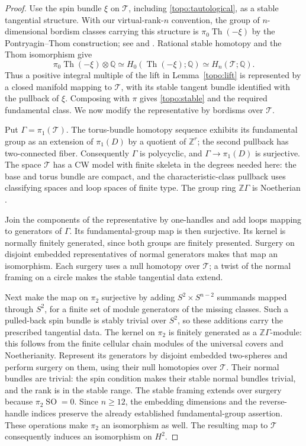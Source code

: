 \documentclass[11pt]{article}
\numberwithin{equation}{section}
\theoremstyle{definition}
\theoremstyle{remark}
\newcommand{\Q}{\mathbb Q}
\newcommand{\Z}{\mathbb Z}
\DeclareMathOperator{\SO}{SO}
\begin{document}
\begin{proof}
Use the spin bundle $\xi$ on $\mathscr T$, including
\eqref{topo:tautological}, as a stable tangential structure.
With our virtual-rank-$n$ convention, the group of $n$-dimensional
bordism classes carrying this structure is
$\pi_0\operatorname{Th}(-\xi)$ by the Pontryagin--Thom construction;
see \cite{Thom1954} and \cite[Section~2.3]{RathelFournier2024}.
Rational stable homotopy and the Thom isomorphism give
\[
 \pi_0\operatorname{Th}(-\xi)\otimes\Q
 \simeq H_0(\operatorname{Th}(-\xi);\Q)
 \simeq H_n(\mathscr T;\Q).
\]
Thus a positive integral multiple of the lift in Lemma~\ref{topo:lift}
is represented
by a closed manifold mapping to $\mathscr T$, with its stable tangent
bundle identified with the pullback of $\xi$.  Composing with $\pi$
gives \eqref{topo:stable} and the required fundamental class.  We now
modify the representative by bordisms over $\mathscr T$.

Put $\Gamma=\pi_1(\mathscr T)$.  The torus-bundle homotopy sequence
exhibits its fundamental group as an extension of $\pi_1(D)$ by a
quotient of $\Z^r$; the second pullback has two-connected fiber.
Consequently $\Gamma$ is polycyclic, and $\Gamma\to\pi_1(D)$ is
surjective.  The space $\mathscr T$ has a CW model with finite skeleta
in the degrees needed here: the base and torus bundle are compact,
and the characteristic-class pullback uses classifying spaces and
loop spaces of finite type.  The group ring $\Z\Gamma$ is
Noetherian \cite{Hall1954}.

Join the components of the representative by one-handles and add
loops mapping to generators of $\Gamma$.  Its fundamental-group map
is then surjective.  Its kernel is normally finitely generated,
since both groups are finitely presented.  Surgery on disjoint
embedded representatives of normal generators makes that map an
isomorphism.  Each surgery uses a null homotopy over $\mathscr T$;
a twist of the normal framing on a circle makes the stable tangential
data extend.

Next make the map on $\pi_2$ surjective by adding
$S^2\times S^{n-2}$ summands mapped through $S^2$, for a finite set
of module generators of the missing classes.  Such a pulled-back
spin bundle is stably trivial over $S^2$, so these additions carry
the prescribed tangential data.  The kernel on $\pi_2$ is finitely
generated as a $\Z\Gamma$-module: this follows from the finite
cellular chain modules of the universal covers and Noetherianity.
Represent its generators by disjoint embedded two-spheres and
perform surgery on them, using their null homotopies over
$\mathscr T$.  Their normal bundles are trivial: the spin condition
makes their stable normal bundles trivial, and the rank is in the
stable range.  The stable framing extends over surgery because
$\pi_2\SO=0$.  Since $n\geq12$, the embedding dimensions and the
reverse-handle indices preserve the already established
fundamental-group assertion.  These operations make $\pi_2$ an
isomorphism as well.  The resulting map to $\mathscr T$ consequently
induces an isomorphism on $H^2$.


\end{proof}
\end{document}
